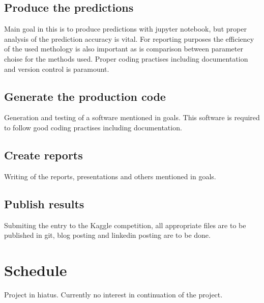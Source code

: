 \documentclass{article}
\begin{document}
\subsection{Produce the predictions}
Main goal in this is to produce predictions with jupyter notebook, but proper analysis of the prediction accuracy is vital. For reporting purposes the efficiency of the used methology is also important as is comparison between parameter choise for the methods used. Proper coding practises including documentation and version control is paramount.

\subsection{Generate the production code}
Generation and testing of a software mentioned in goals. This software is required to follow good coding practises including documentation.

\subsection{Create reports}
Writing of the reports, presentations and others mentioned in goals.
 
\subsection{Publish results}
Submiting the entry to the Kaggle competition, all appropriate files are to be published in git, blog posting and linkedin posting are to be done.

\section{Schedule}
Project in hiatus. Currently no interest in continuation of the project. 
\end{document}

